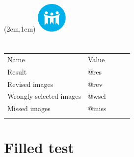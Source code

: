 \documentclass[12pt,a4paper]{article}
\begin{document}
\textblockorigin{-18pt}{-2pt}
\begin{textblock*}{10cm}(2cm,1cm)
\includegraphics[width=1.5cm]{logo.png}
\end{textblock*}



\section*{}
\begin{table}[]
\begin{tabular}{lllll}
\cline{1-2}
\multicolumn{1}{|l|}{Name} & \multicolumn{1}{l|}{Value} &  &  \\ \cline{1-2}
\multicolumn{1}{|l|}{Result}  & \multicolumn{1}{l|}{@res} &  &  \\ \cline{1-2}
\multicolumn{1}{|l|}{Revised images}  & \multicolumn{1}{l|}{@rev} &  &  \\ \cline{1-2}
\multicolumn{1}{|l|}{Wrongly selected images}  & \multicolumn{1}{l|}{@wsel} &  &  \\ \cline{1-2}
\multicolumn{1}{|l|}{Missed images}  & \multicolumn{1}{l|}{@miss} &  &  \\ \cline{1-2}

                       &                       &                       &  & 
\end{tabular}
\end{table}










\textblockorigin{-18pt}{-2pt}

\newpage
\section*{Filled test}
\end{document}
